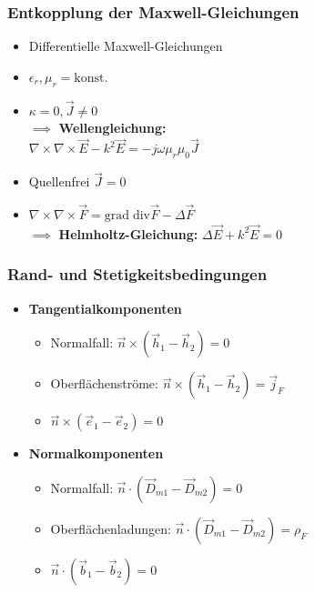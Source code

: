 \begin{multicols}{3}
{	 \subsubsection{Entkopplung der Maxwell-Gleichungen}
	 \begin{itemize}
	 	\itemsep0pt
		\item Differentielle Maxwell-Gleichungen
		\item \(\epsilon_r, \mu_r = \mathrm{konst.}\)
		\item \(\kappa = 0, \vec{J} \neq 0\)\\
	 	\(\implies\) \textbf{Wellengleichung:}\\\vspace{2pt}
		\(\nabla\!\times\!\nabla\!\times\!\vec{E} - k^2\vec{E} = -j\omega\mu_r\mu_0\vec{J}\)
		\item Quellenfrei \(\vec{J} = 0\)
		\item \(\nabla\!\times\!\nabla\!\times\!\vec{F} = \mathrm{grad}\;\mathrm{div}\vec{F} - \Delta\vec{F}\)\\
		\(\implies\) \textbf{Helmholtz-Gleichung:} \(\Delta\vec{E} + k^2\vec{E} = 0\)
	 \end{itemize}

	 \subsubsection{Rand- und Stetigkeitsbedingungen}
	 \begin{itemize}
	 	\itemsep0pt
		\item \textbf{Tangentialkomponenten}
		\begin{itemize}
			\itemsep0pt
			\item Normalfall: \(\vec{n}\times\left(\vec{h}_1 - \vec{h}_2\right) = 0\)
			\item Oberflächenströme: \(\vec{n}\times\left(\vec{h}_1 - \vec{h}_2\right) = \vec{j}_F\)
			\item \(\vec{n}\times\left(\vec{e}_1 - \vec{e}_2\right) = 0\)
		\end{itemize}
		\item \textbf{Normalkomponenten}
		\begin{itemize}
			\itemsep0pt
			\item Normalfall: \(\vec{n}\cdot\left(\vec{D}_{m1} - \vec{D}_{m2}\right) = 0\)
			\item Oberflächenladungen: \(\vec{n}\cdot\left(\vec{D}_{m1} - \vec{D}_{m2}\right) = \rho_F\)
			\item \(\vec{n}\cdot\left(\vec{b}_1 - \vec{b}_2\right) = 0\)
		\end{itemize}
	 \end{itemize}
	 }


\end{multicols}

